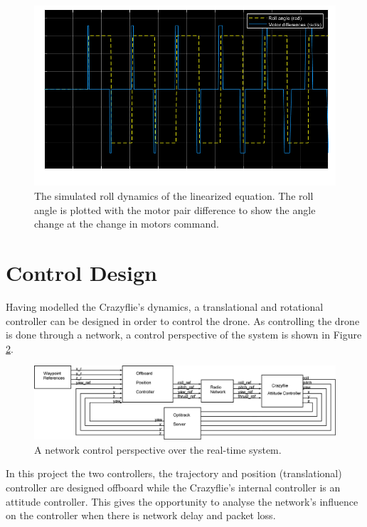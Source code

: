 \begin{figure}[H]
\centering
 \includegraphics[width=\textwidth]{Figures/lin_roll.png}
 \caption{The simulated roll dynamics of the linearized equation. The roll angle is plotted with the motor pair difference to show the angle change at the change in motors command.}
 \label{figure:sim_roll}
\end{figure}

\section{Control Design}
\label{section:Control}

Having modelled the Crazyflie's dynamics, a translational and rotational controller can be designed in order to control the drone. As controlling the drone is done through a network, a control perspective of the system is shown in Figure \ref{figure:controller_network}.

\begin{figure}[H]
\centering
 \includegraphics[width=\textwidth]{Figures/updated_network_view.png}
 \caption{A network control perspective over the real-time system.}
 \label{figure:controller_network}
\end{figure}

In this project the two controllers, the trajectory and position (translational) controller are designed offboard while the Crazyflie's internal controller is an attitude controller. This gives the opportunity to analyse the network's influence on the controller when there is network delay and packet loss.\\

